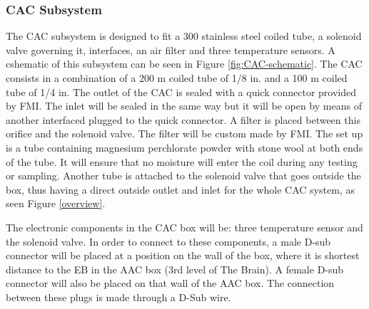 



\pagebreak
\subsubsection{CAC Subsystem}

The CAC subsystem is designed to fit a 300  stainless steel coiled tube, a solenoid valve governing it, interfaces, an air filter and three temperature sensors. A cshematic of this subsystem can be seen in Figure \ref{fig:CAC-schematic}. The CAC consists in a combination of a 200 m coiled tube of 1/8 in. and a 100 m coiled tube of 1/4 in. The outlet of the CAC is sealed with a quick connector provided by FMI. The inlet will be sealed in the same way but it will be open by means of another interfaced plugged to the quick connector. A filter is placed between this orifice and the solenoid valve. The filter will be custom made by FMI. The set up is a tube containing magnesium perchlorate powder with stone wool at both ends of the tube. It will ensure that no moisture will enter the coil during any testing or sampling. Another tube is attached to the solenoid valve that goes outside the box, thus having a direct outside outlet and inlet for the whole CAC system, as seen Figure \ref{overview}.

\smallskip
The electronic components in the CAC box will be: three temperature sensor and the solenoid valve. In order to connect to these components, a male D-sub connector will be placed at a position on the wall of the box, where it is shortest distance to the EB in the AAC box (3rd level of The Brain). A female D-sub connector will also be placed on that wall of the AAC box. The connection between these plugs is made through a D-Sub wire. 

